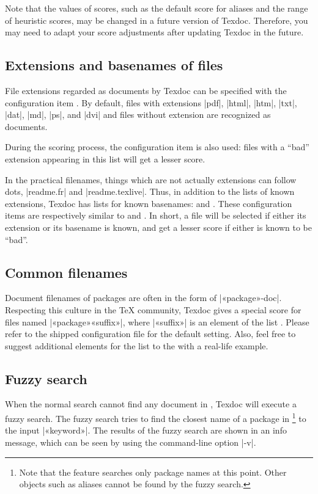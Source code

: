 \documentclass{texdoc-doc}
\begin{document}
Note that the values of scores, such as the default score for aliases and the
range of heuristic scores, may be changed in a future version of Texdoc.
Therefore, you may need to adapt your score adjustments after updating Texdoc
in the future.

\subsection{Extensions and basenames of files}
\label{sec:ext}

File extensions regarded as documents by Texdoc can be specified with the
configuration item . By default, files with extensions |pdf|,
|html|, |htm|, |txt|, |dat|, |md|, |ps|, and |dvi| and files without extension
are recognized as documents.

During the scoring process, the configuration item  is also used:
files with a ``bad'' extension appearing in this list will get a lesser score.

In the practical filenames, things which are not actually extensions can follow
dots, \eg |readme.fr| and |readme.texlive|. Thus, in addition to the lists of
known extensions, Texdoc has lists for known basenames:  and
. These configuration items are respectively similar to
 and . In short, a file will be selected if
either its extension or its basename is known, and get a lesser score if either
is known to be ``bad''.

\subsection{Common filenames}
\label{sec:common-names}

Document filenames of packages are often in the form of |«package»-doc|.
Respecting this culture in the {\TeX} community, Texdoc gives a special score
for files named |«package»«suffix»|, where |«suffix»| is an element of the list
. Please refer to the shipped configuration file for the
default setting. Also, feel free to suggest additional elements for the list to
the {\TexdocML} with a real-life example.

\subsection{Fuzzy search}
\label{sec:fuzzy}

When the normal search cannot find any document in {\TL}, Texdoc will execute a
fuzzy search. The fuzzy search tries to find the closest name of a package in
{\TL}\footnote{Note that the feature searches only package names at this point.
Other objects such as aliases cannot be found by the fuzzy search.} to the
input |«keyword»|. The results of the fuzzy search are shown in an info
message, which can be seen by using the command-line option |-v|.
\end{document}
